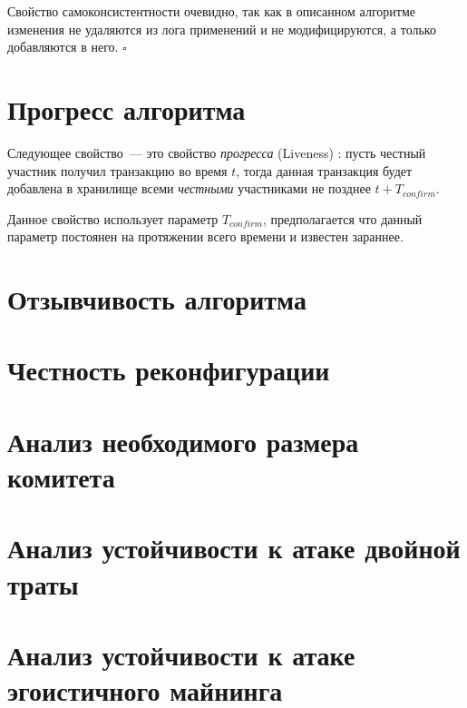 Свойство самоконсистентности очевидно, так как в описанном алгоритме изменения не удаляются из лога применений и не модифицируются, а только добавляются в него. $\square$

\section{Прогресс алгоритма}
\noindent Следующее свойство~--- это свойство \textit{прогресса} (Liveness) \cite{hybrid-consensus}:
пусть честный участник получил транзакцию во время $t$, тогда данная транзакция будет добавлена в хранилище всеми \textit{честными} участниками не позднее $t + T_{confirm}$.

Данное свойство использует параметр $T_{confirm}$, предполагается что данный параметр постоянен на протяжении всего времени и известен зараннее.

\section{Отзывчивость алгоритма}

\section{Честность реконфигурации}

\section{Анализ необходимого размера комитета}

\section{Анализ устойчивости к атаке двойной траты}

\section{Анализ устойчивости к атаке эгоистичного майнинга}